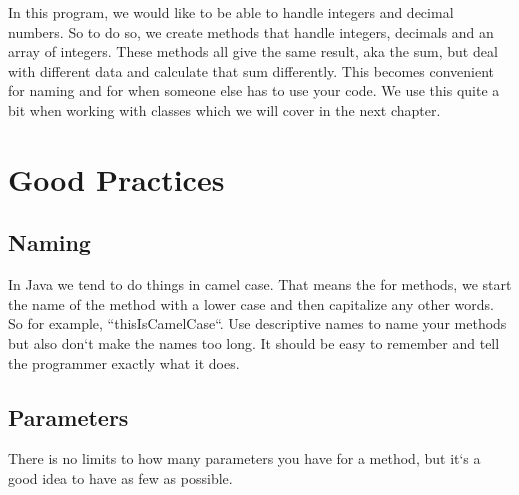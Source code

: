 \documentclass[11]{article}
\begin{document}
In this program, we would like to be able to handle integers and decimal numbers. So to do so, we create methods that handle integers, decimals and an array of integers. These methods all give the same result, aka the sum, but deal with different data and calculate that sum differently. This becomes convenient for naming and for when someone else has to use your code. We use this quite a bit when working with classes which we will cover in the next chapter.

\section{Good Practices}
\subsection{Naming}
In Java we tend to do things in camel case. That means the for methods, we start the name of the method with a lower case and then capitalize any other words. So for example, ``thisIsCamelCase``. Use descriptive names to name your methods but also don`t make the names too long. It should be easy to remember and tell the programmer exactly what it does.
\subsection{Parameters}
There is no limits to how many parameters you have for a method, but it`s a good idea to have as few as possible.
\end{document}
